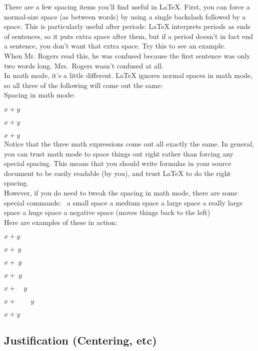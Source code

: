 There are a few spacing items you'll find useful in {\LaTeX}. First, you can force a normal-size space (as between words) by using a single backslash followed by a space. This is particularly useful after periods: LaTeX interprets periods as ends of sentences, so it puts extra space after them, but if a period doesn't in fact end a sentence, you don't want that extra space. Try this to see an example.\\

When Mr. Rogers read this, he was confused because the first sentence was only two words long. Mrs.\ Rogers wasn't confused at all.\\

In math mode, it's a little different. LaTeX ignores normal spaces in math mode, so all three of the following will come out the same:\\

Spacing in math mode:

$x + y$

$x     +       y$

$x+y$
\\
Notice that the three math expressions come out all exactly the same. In general, you can trust math mode to space things out right rather than forcing any special spacing. This means that you should write formulas in your source document to be easily readable (by you), and trust LaTeX to do the right spacing.\\

However, if you do need to tweak the spacing in math mode, there are some special commands:
\, 	a small space
\: 	a medium space
\; 	a large space
\quad 	a really large space
\qquad 	a huge space
\! 	a negative space (moves things back to the left)\\

Here are examples of these in action:

$x+y$

$x+\,y$

$x+\:y$

$x+\;y$

$x+\quad y$

$x+\qquad y$

$x+\!y$

\subsection{Justification (Centering, etc)}

